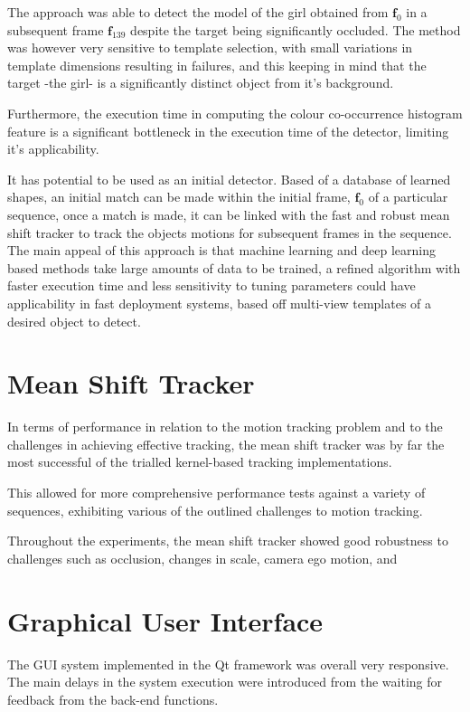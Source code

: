 The approach was able to detect the model of the girl obtained from
$\mathbf{f}_0$ in a subsequent frame $\mathbf{f}_{139}$ despite the target being
significantly occluded. 
The method was however very sensitive to template selection, with small
variations in template dimensions resulting in failures, and this keeping in
mind that the target -the girl- is a significantly distinct object from it's
background. 

Furthermore, the execution time in computing the colour co-occurrence histogram
feature is a significant bottleneck in the execution time of the detector,
limiting it's applicability. 

It has potential to be used as an initial detector. Based of a database of
learned shapes, an initial match can be made within the initial frame,
$\mathbf{f}_0$ of a particular sequence, once a match is made, it can be linked
with the fast and robust mean shift tracker to track the objects motions for
subsequent frames in the sequence. 
The main appeal of this approach is that machine learning and deep learning
based methods take large amounts of data to be trained, a refined algorithm with
faster execution time and less sensitivity to tuning parameters could have
applicability in fast deployment systems, based off multi-view templates of a
desired object to detect.

\section{Mean Shift Tracker}
In terms of performance in relation to the motion tracking problem and to the
challenges in achieving effective tracking, the mean shift tracker was by far
the most successful of the trialled kernel-based tracking implementations.

This allowed for more comprehensive performance tests against a variety of
sequences, exhibiting various of the outlined challenges to motion tracking.

Throughout the experiments, the mean shift tracker showed good robustness to
challenges such as occlusion, changes in scale, camera ego motion, and  


\section{Graphical User Interface}
The GUI system implemented in the Qt framework was overall very responsive. The
main delays in the system execution were introduced from the waiting for
feedback from the back-end functions.

